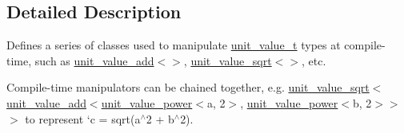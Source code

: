 \subsection{Detailed Description}
Defines a series of classes used to manipulate {\ttfamily \hyperlink{structunits_1_1unit__value__t}{unit\+\_\+value\+\_\+t}} types at compile-\/time, such as {\ttfamily \hyperlink{structunits_1_1unit__value__add}{unit\+\_\+value\+\_\+add}$<$$>$}, {\ttfamily \hyperlink{structunits_1_1unit__value__sqrt}{unit\+\_\+value\+\_\+sqrt}$<$$>$}, etc. 

Compile-\/time manipulators can be chained together, e.\+g. {\ttfamily \hyperlink{structunits_1_1unit__value__sqrt}{unit\+\_\+value\+\_\+sqrt}$<$\hyperlink{structunits_1_1unit__value__add}{unit\+\_\+value\+\_\+add}$<$\hyperlink{structunits_1_1unit__value__power}{unit\+\_\+value\+\_\+power}$<$a, 2$>$, \hyperlink{structunits_1_1unit__value__power}{unit\+\_\+value\+\_\+power}$<$b, 2$>$$>$$>$} to represent `c = sqrt(a$^\wedge$2 + b$^\wedge$2). 